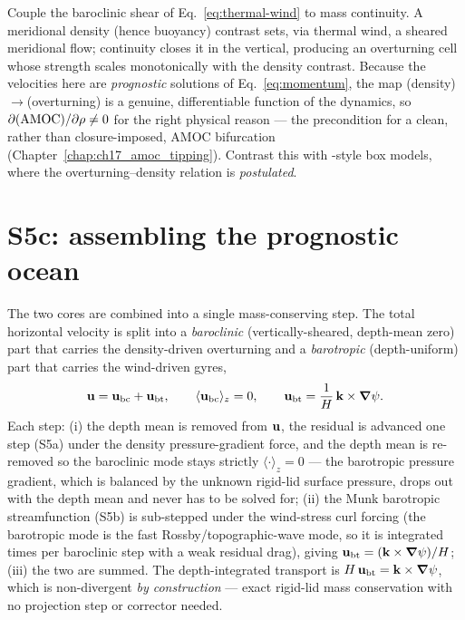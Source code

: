 \begin{proposition}
Couple the baroclinic shear of Eq.~\eqref{eq:thermal-wind} to mass continuity. A meridional
density (hence buoyancy) contrast sets, via thermal wind, a sheared meridional flow; continuity
closes it in the vertical, producing an overturning cell whose strength scales monotonically with
the density contrast. Because the velocities here are \emph{prognostic} solutions of
Eq.~\eqref{eq:momentum}, the map (density)$\to$(overturning) is a genuine, differentiable function
of the dynamics, so $\partial(\mathrm{AMOC})/\partial\rho\neq0$ for the right physical reason ---
the precondition for a clean, rather than closure-imposed, AMOC bifurcation
(Chapter~\ref{chap:ch17_amoc_tipping}). Contrast this with \citet{marotzke1991}-style box models,
where the overturning--density relation is \emph{postulated}.
\end{proposition}

\section{S5c: assembling the prognostic ocean}\label{sec:s5c}

The two cores are combined into a single mass-conserving step. The total horizontal velocity is
split into a \emph{baroclinic} (vertically-sheared, depth-mean zero) part that carries the
density-driven overturning and a \emph{barotropic} (depth-uniform) part that carries the
wind-driven gyres,
\begin{equation}\label{eq:split}
  \mathbf{u}=\mathbf{u}_{\mathrm{bc}}+\mathbf{u}_{\mathrm{bt}},\qquad
  \langle\mathbf{u}_{\mathrm{bc}}\rangle_z=0,\qquad
  \mathbf{u}_{\mathrm{bt}}=\frac{1}{H}\,\mathbf{k}\times\boldsymbol{\nabla}\psi .
\end{equation}
Each step: (i) the depth mean is removed from $\mathbf{u}$, the residual is advanced one
 step (S5a) under the density pressure-gradient force, and the depth
mean is re-removed so the baroclinic mode stays strictly $\langle\cdot\rangle_z=0$ --- the
barotropic pressure gradient, which is balanced by the unknown rigid-lid surface pressure, drops
out with the depth mean and never has to be solved for; (ii) the Munk barotropic streamfunction
(S5b) is sub-stepped under the wind-stress curl forcing (the barotropic mode is the fast
Rossby/topographic-wave mode, so it is integrated  times per baroclinic step with
a weak residual drag), giving $\mathbf{u}_{\mathrm{bt}}=(\mathbf{k}\times\boldsymbol{\nabla}\psi)/H$; (iii) the two are
summed. The depth-integrated transport is $H\,\mathbf{u}_{\mathrm{bt}}=\mathbf{k}\times\boldsymbol{\nabla}\psi$, which
is non-divergent \emph{by construction} --- exact rigid-lid mass conservation with no projection
step or corrector needed.

